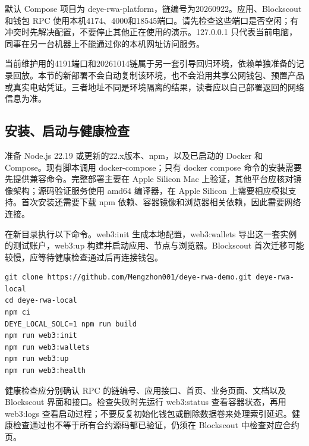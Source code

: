 \documentclass[12pt,a4paper]{article}
\begin{document}
默认 Compose 项目为 deye-rwa-platform，链编号为20260922。应用、Blockscout 和钱包 RPC 使用本机4174、4000和18545端口。请先检查这些端口是否空闲；有冲突时先解决配置，不要停止其他正在使用的演示。127.0.0.1 只代表当前电脑，同事在另一台机器上不能通过你的本机网址访问服务。

当前维护用的4191端口和20261014链属于另一套引导回归环境，依赖单独准备的记录回放。本节的新部署不会自动复制该环境，也不会沿用共享公网钱包、预置产品或真实电站凭证。三者地址不同是环境隔离的结果，读者应以自己部署返回的网络信息为准。

\begin{center}\end{center}
\clearpage
\subsection{安装、启动与健康检查}
准备 Node.js 22.19 或更新的22.x版本、npm，以及已启动的 Docker 和 Compose。现有脚本调用 docker-compose；只有 docker compose 命令的安装需要先提供兼容命令。完整部署主要在 Apple Silicon Mac 上验证，其他平台应核对镜像架构；源码验证服务使用 amd64 编译器，在 Apple Silicon 上需要相应模拟支持。首次安装还需要下载 npm 依赖、容器镜像和浏览器相关依赖，因此需要网络连接。

在新目录执行以下命令。web3:init 生成本地配置，web3:wallets 导出这一套实例的测试账户，web3:up 构建并启动应用、节点与浏览器。Blockscout 首次迁移可能较慢，应等待健康检查通过后再连接钱包。

\begin{verbatim}
git clone https://github.com/Mengzhon001/deye-rwa-demo.git deye-rwa-local
cd deye-rwa-local
npm ci
DEYE_LOCAL_SOLC=1 npm run build
npm run web3:init
npm run web3:wallets
npm run web3:up
npm run web3:health
\end{verbatim}
健康检查应分别确认 RPC 的链编号、应用接口、首页、业务页面、文档以及 Blockscout 界面和接口。检查失败时先运行 web3:status 查看容器状态，再用 web3:logs 查看启动过程；不要反复初始化钱包或删除数据卷来处理索引延迟。健康检查通过也不等于所有合约源码都已验证，仍须在 Blockscout 中检查对应合约页。
\end{document}
